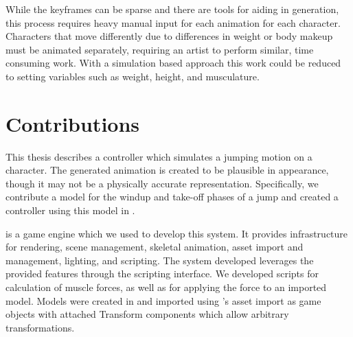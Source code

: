 While the keyframes can be sparse and there are tools for aiding in generation, this process requires heavy manual input for each animation for each character.  Characters that move differently due to differences in weight or body makeup must be animated separately, requiring an artist to perform similar, time consuming work.  With a simulation based approach this work could be reduced to setting variables such as weight, height, and musculature.

\section{Contributions}
	This thesis describes a controller which simulates a jumping motion on a character.  The generated animation is created to be plausible in appearance, though it may not be a physically accurate representation.  Specifically, we contribute a model for the windup and take-off phases of a jump and created a controller using this model in \unity.

	\unity is a game engine which we used to develop this system.  It provides infrastructure for rendering, scene management, skeletal animation, asset import and management, lighting, and scripting.  The system developed leverages the provided features through the \unity scripting interface.  We developed scripts for calculation of muscle forces, as well as for applying the force to an imported model.  Models were created in \maya and imported using \unity's asset import as \unity game objects with attached Transform components which allow arbitrary transformations.
